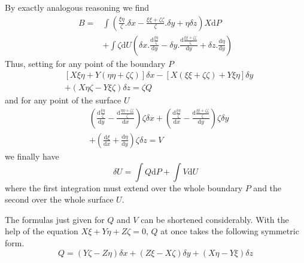 By exactly analogous reasoning we find
\[
\begin{aligned}
B={}&\int(\frac{\xi\eta}{\zeta}.\delta x-\frac{\xi\xi+\zeta\zeta}{\zeta}.\delta y+\eta\delta z)X\mathrm{d}P\\
&+\int\zeta\mathrm{d}U(\delta x.\frac{\mathrm{d}\frac{\xi\eta}{\zeta}}{\mathrm{d}y}-\delta y.\frac{\mathrm{d}\frac{\xi\xi+\zeta\zeta}{\zeta}}{\mathrm{d}y}+\delta z.\frac{\mathrm{d}\eta}{\mathrm{d}y})
\end{aligned}
\]
Thus, setting for any point of the boundary $P$
\[
\begin{aligned}
&[X\xi\eta+Y(\eta\eta+\zeta\zeta)]\delta x-[X(\xi\xi+\zeta\zeta)+Y\xi\eta]\delta y\\
&+(X\eta\zeta-Y\xi\zeta)\delta z=\zeta Q
\end{aligned}
\]
and for any point of the surface $U$
\[
\begin{aligned}
&(\frac{\mathrm{d}\frac{\xi\eta}{\zeta}}{\mathrm{d}y}-\frac{\mathrm{d}\frac{\eta\eta+\zeta\zeta}{\zeta}}{\mathrm{d}x})\zeta\delta x+(\frac{\mathrm{d}\frac{\xi\eta}{\zeta}}{\mathrm{d}x}-\frac{\mathrm{d}\frac{\xi\xi+\zeta\zeta}{\zeta}}{\mathrm{d}y})\zeta\delta y\\
&+(\frac{\mathrm{d}\xi}{\mathrm{d}x}+\frac{\mathrm{d}\eta}{\mathrm{d}y})\zeta\delta z=V
\end{aligned}
\]
we finally have
\[
\delta U=\int Q\mathrm{d}P+\int V\mathrm{d}U
\]
where the first integration must extend over the whole boundary $P$ and the second over the whole surface $U$.

The formulas just given for $Q$ and $V$ can be shortened considerably. With the help of the equation $X\xi+Y\eta+Z\zeta=0$, $Q$ at once takes the following symmetric form.
\[
Q=(Y\zeta-Z\eta)\delta x+(Z\xi-X\zeta)\delta y+(X\eta-Y\xi)\delta z
\]

